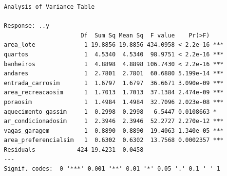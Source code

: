 \documentclass[
  letterpaper,
  DIV=11,
  numbers=noendperiod]{scrartcl}
\begin{document}
\begin{verbatim}
Analysis of Variance Table

Response: ..y
                      Df  Sum Sq Mean Sq  F value    Pr(>F)    
area_lote              1 19.8856 19.8856 434.0958 < 2.2e-16 ***
quartos                1  4.5340  4.5340  98.9751 < 2.2e-16 ***
banheiros              1  4.8898  4.8898 106.7430 < 2.2e-16 ***
andares                1  2.7801  2.7801  60.6880 5.199e-14 ***
entrada_carrosim       1  1.6797  1.6797  36.6671 3.090e-09 ***
area_recreacaosim      1  1.7013  1.7013  37.1384 2.474e-09 ***
poraosim               1  1.4984  1.4984  32.7096 2.023e-08 ***
aquecimento_gassim     1  0.2998  0.2998   6.5447 0.0108663 *  
ar_condicionadosim     1  2.3946  2.3946  52.2727 2.270e-12 ***
vagas_garagem          1  0.8890  0.8890  19.4063 1.340e-05 ***
area_preferencialsim   1  0.6302  0.6302  13.7568 0.0002357 ***
Residuals            424 19.4231  0.0458                       
---
Signif. codes:  0 '***' 0.001 '**' 0.01 '*' 0.05 '.' 0.1 ' ' 1
\end{verbatim}
\end{document}
